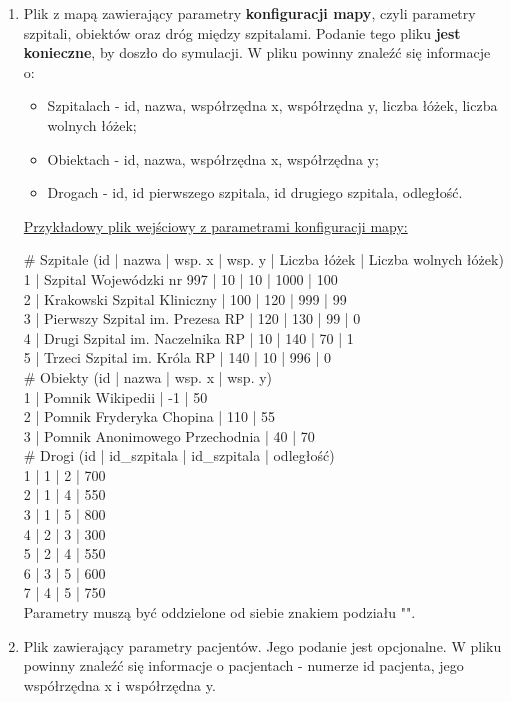 \documentclass{article}
\begin{document}
    \begin{enumerate}
        \item Plik z mapą zawierający parametry \textbf{konfiguracji mapy}, czyli parametry szpitali, obiektów oraz dróg między szpitalami. Podanie tego pliku \textbf{jest konieczne}, by doszło do symulacji.
        W pliku powinny znaleźć się informacje o:
        \begin{itemize}
            \item Szpitalach - id, nazwa, współrzędna x, współrzędna y, liczba łóżek, liczba wolnych łóżek;
            \item Obiektach - id, nazwa, współrzędna x, współrzędna y;
            \item Drogach - id, id pierwszego szpitala, id drugiego szpitala, odległość.
        \end{itemize}

        \begin{center}
            \underline{Przykładowy plik wejściowy z parametrami konfiguracji mapy:} \\
        \end{center}
        \# Szpitale (id | nazwa | wsp. x | wsp. y | Liczba łóżek | Liczba wolnych łóżek) \\
        1 | Szpital Wojewódzki nr 997 | 10 | 10 | 1000 | 100 \\
        2 | Krakowski Szpital Kliniczny | 100 | 120 | 999 | 99 \\
        3 | Pierwszy Szpital im. Prezesa RP | 120 | 130 | 99 | 0 \\
        4 | Drugi Szpital im. Naczelnika RP | 10 | 140 | 70 | 1 \\
        5 | Trzeci Szpital im. Króla RP | 140 | 10 | 996 | 0 \\

        \# Obiekty (id | nazwa | wsp. x | wsp. y) \\
        1 | Pomnik Wikipedii | -1 | 50 \\
        2 | Pomnik Fryderyka Chopina | 110 | 55 \\
        3 | Pomnik Anonimowego Przechodnia | 40 | 70 \\

        \# Drogi (id | id\_szpitala | id\_szpitala | odległość) \\
        1 | 1 | 2 | 700 \\
        2 | 1 | 4 | 550 \\
        3 | 1 | 5 | 800 \\
        4 | 2 | 3 | 300 \\
        5 | 2 | 4 | 550 \\
        6 | 3 | 5 | 600 \\
        7 | 4 | 5 | 750 \\

        Parametry muszą być oddzielone od siebie znakiem podziału "\textbar".
        \item Plik zawierający parametry pacjentów. Jego podanie jest opcjonalne. W pliku powinny znaleźć się informacje o pacjentach - numerze id pacjenta, jego współrzędna x i współrzędna y.
    \end{enumerate}
\end{document}
